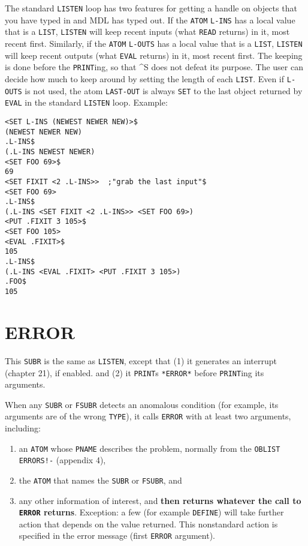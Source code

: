 \documentclass[a4paper]{scrbook}
\providecommand{\tightlist}{%
  \setlength{\itemsep}{0pt}\setlength{\parskip}{0pt}}
\begin{document}
The standard \texttt{LISTEN} loop has two features for getting a handle on objects that you have typed in and MDL has typed
out. If the \texttt{ATOM} \texttt{L-INS} has a local value that is a \texttt{LIST},
\texttt{LISTEN} will keep recent inputs (what \texttt{READ} returns) in it, most recent first. Similarly, if the
\texttt{ATOM} \texttt{L-OUTS} has a local value that is a \texttt{LIST}, \texttt{LISTEN} will
keep recent outputs (what \texttt{EVAL} returns) in it, most recent first. The keeping is done before the
\texttt{PRINT}ing, so that \^{}S does not defeat its purpose. The user can decide how much to keep
around by setting the length of each \texttt{LIST}. Even if \texttt{L-OUTS} is not used, the atom
\texttt{LAST-OUT} is always \texttt{SET} to the last object returned by \texttt{EVAL} in
the standard \texttt{LISTEN} loop. Example:

\begin{verbatim}
<SET L-INS (NEWEST NEWER NEW)>$
(NEWEST NEWER NEW)
.L-INS$
(.L-INS NEWEST NEWER)
<SET FOO 69>$
69
<SET FIXIT <2 .L-INS>>  ;"grab the last input"$
<SET FOO 69>
.L-INS$
(.L-INS <SET FIXIT <2 .L-INS>> <SET FOO 69>)
<PUT .FIXIT 3 105>$
<SET FOO 105>
<EVAL .FIXIT>$
105
.L-INS$
(.L-INS <EVAL .FIXIT> <PUT .FIXIT 3 105>)
.FOO$
105
\end{verbatim}

\section{ERROR}\label{error}

This \texttt{SUBR} is the same as \texttt{LISTEN}, except that (1) it generates an interrupt (chapter 21), if enabled. and
(2) it \texttt{PRINT}s \texttt{*ERROR*} before \texttt{PRINT}ing its arguments.

When any \texttt{SUBR} or \texttt{FSUBR} detects an anomalous condition (for example, its arguments are of the wrong
\texttt{TYPE}), it calls \texttt{ERROR} with at least two arguments, including:

\begin{enumerate}
\def\labelenumi{\arabic{enumi}.}
\tightlist
\item
  an \texttt{ATOM} whose \texttt{PNAME} describes the problem, normally from the \texttt{OBLIST}
  \texttt{ERRORS!-} (appendix 4),
\item
  the \texttt{ATOM} that names the \texttt{SUBR} or \texttt{FSUBR}, and
\item
  any other information of interest, and \textbf{then returns whatever the call to \texttt{ERROR} returns}. Exception: a
  few (for example \texttt{DEFINE}) will take further action that depends on the value returned.
  This nonstandard action is specified in the error message (first \texttt{ERROR} argument).
\end{enumerate}
\end{document}
